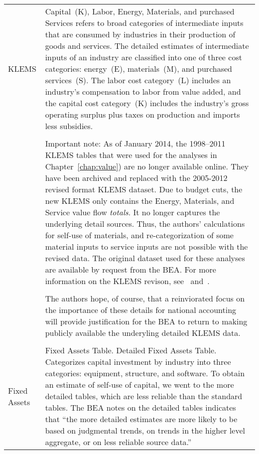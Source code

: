 \begin{table}
\begin{center}
\begin{tabular}{l @{\hspace{2em}} p{10cm}}
KLEMS 		& 	Capital~(K), Labor, Energy, Materials, and purchased Services
				refers to broad categories of intermediate inputs 
				that are consumed by industries in their production 
				of goods and services.\cite{Strassner:2005aa}
				The detailed estimates of intermediate inputs of an industry 
				are classified into one of three cost categories:
				energy~(E), materials~(M), and purchased services~(S).
				The labor cost category~(L) includes an industry’s compensation 
				to labor from value added, 
				and the capital cost category~(K) includes the industry’s 
				gross operating surplus plus taxes on production and imports less subsidies.  \\
			&	\\
			& 	Important note: As of January 2014, the 1998--2011 KLEMS tables
				that were used for the analyses in Chapter~\ref{chap:value}) are 
				no longer available online. They have been archived and replaced 
				with the 2005-2012 revised format KLEMS dataset. Due to budget
				cuts, the new
				KLEMS only contains the Energy, Materials, and Service
				value flow \emph{totals}. It no longer captures the underlying detail
				sources. Thus, the authors' calculations for self-use of
				materials, and re-categorization of some material inputs
				to service inputs are not possible with the revised data.
				The original dataset used for these analyses are available
				by request from the BEA. For more information
				on the KLEMS revison, see~\cite{kim2014} and~\cite{BEAKLEMSData}.\\
			&	\\
			& 	The authors hope, of course, that a reinviorated focus on
				the importance of these details for national accounting
				will provide justification for the BEA to return to 
				making publicly available the underyling detailed KLEMS data.\\
			& 	\\
Fixed Assets &	Fixed Assets Table. Detailed Fixed Assets Table. 
				Categorizes capital investment by industry into three categories:
				equipment, structure, and software. 
				To obtain an estimate of self-use of capital, 
				we went to the more detailed tables, 
				which are less reliable than the standard tables. 
				The BEA notes on the detailed tables indicates that 
				``the more detailed estimates are more likely to be based on judgmental trends, 
				on trends in the higher level aggregate, 
				or on less reliable source data.''~\cite[Table~2.5]{BEADetailedData}\\
    \bottomrule
  \end{tabular}

\end{center}
\label{tab:data_definitions}
\end{table}

